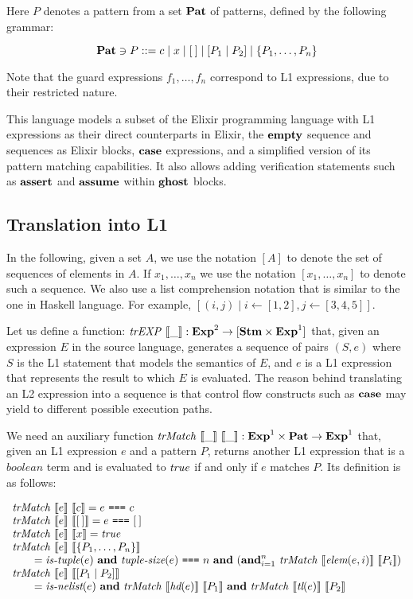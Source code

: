Here $P$ denotes a pattern from a set $\mathbf{Pat}$ of patterns, defined by the 
following grammar:

\[
\mathbf{Pat} \ni P ::= c \mid x \mid [\:] \mid [P_1 \mid P_2] \mid \{ P_1, \ldots, P_n \}
\]

Note that the guard expressions $f_1, \ldots, f_n$ correspond to L1 expressions,
due to their restricted nature.

This language models a subset of the Elixir programming language with L1
expressions as their direct counterparts in Elixir, the $\textbf{empty}$ sequence and
sequences as Elixir blocks, $\textbf{case}$ expressions, and a simplified version of
its pattern matching capabilities.  It also allows adding verification
statements such as $\textbf{assert}$ and $\textbf{assume}$ within $\textbf{ghost}$ blocks.

\subsection{Translation into L1}

In the following, given a set $A$, we use the notation $[A]$ to denote the set
of sequences of elements in $A$. If $x_1, \ldots, x_n$ we use the notation 
$[x_1, \ldots, x_n]$ to denote such a sequence. We also use a list comprehension
notation that is similar to the one in Haskell language. For example, $[(i, j)
\mid i \leftarrow [1, 2], j \leftarrow [3, 4, 5]]$.

Let us define a function: $\mathit{trEXP}~\llbracket\_\rrbracket : \mathbf{Exp}^{2} \rightarrow [\mathbf{Stm} \times
\mathbf{Exp}^{1}]$ that, given an expression $E$ in the source language, generates a
sequence of pairs $(S, e)$ where $S$ is the L1 statement that models the
semantics of $E$, and $e$ is a L1 expression that represents the result to which
$E$ is evaluated. The reason behind translating an L2 expression into a sequence
is that control flow constructs such as $\textbf{case}$ may yield to different possible
execution paths. 

We need an auxiliary function $\mathit{trMatch}~\llbracket\_\rrbracket~\llbracket\_\rrbracket : \mathbf{Exp}^{1} \times \mathbf{Pat}
\rightarrow \mathbf{Exp}^{1}$ that, given an L1 expression $e$ and a pattern $P$, returns
another L1 expression that is a $\mathit{boolean}$ term and is evaluated to
$\mathit{true}$ if and only if $e$ matches $P$. Its definition is as follows:

\[
\begin{array}{l}
\mathit{trMatch}~\llbracket e\rrbracket~\llbracket c\rrbracket = e~\texttt{===}~{c}\\
\mathit{trMatch}~\llbracket e\rrbracket~\llbracket[\:]\rrbracket = e~\texttt{===}~{[\:]} \\
\mathit{trMatch}~\llbracket e\rrbracket~\llbracket x\rrbracket = \mathit{true}\\
\mathit{trMatch}~\llbracket e\rrbracket~\llbracket\{P_1,\ldots,P_n\}\rrbracket\\
\qquad = \textit{is-tuple}(e)~\mathbf{and}~\textit{tuple-size}(e)~\texttt{===}~n~\mathbf{and}~(\mathbf{and}_{i=1}^n~\mathit{trMatch}~\llbracket\textit{elem}(e, i)\rrbracket~\llbracket P_i\rrbracket)\\
\mathit{trMatch}~\llbracket e\rrbracket~\llbracket[P_1\mid P_2]\rrbracket\\
\qquad = \textit{is-nelist}(e)~\mathbf{and}~\mathit{trMatch}~\llbracket\textit{hd}(e)\rrbracket~\llbracket P_1\rrbracket~\mathbf{and}~\mathit{trMatch}~\llbracket\textit{tl}(e)\rrbracket~\llbracket P_2\rrbracket
\end{array}
\]

